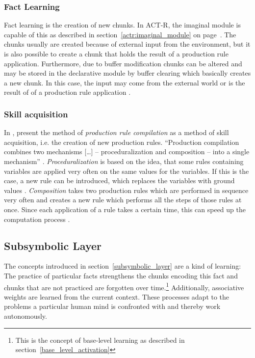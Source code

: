 \subsubsection{Fact Learning}

Fact learning is the creation of new chunks. In ACT-R, the imaginal module is capable of this as described in section~\ref{actr:imaginal_module} on page~\pageref{actr:imaginal_module}. The chunks usually are created because of external input from the environment, but it is also possible to create a chunk that holds the result of a production rule application. Furthermore, due to buffer modification chunks can be altered and may be stored in the declarative module by buffer clearing which basically creates a new chunk. In this case, the input may come from the external world or is the result of of a production rule application \cite[7]{whitehill_understanding}.

\subsubsection{Skill acquisition}

In \cite{taatgen_production_2003}, \citeauthor{taatgen_production_2003} present the method of \emph{production rule compilation} as a method of skill acquisition, i.e. the creation of new production rules. ``Production compilation combines two mechanisms [\dots] -- proceduralization and composition -- into a single mechanism'' \cite[62]{taatgen_production_2003}. \emph{Proceduralization} is based on the idea, that some rules containing variables are applied very often on the same values for the variables. If this is the case, a new rule can be introduced, which replaces the variables with ground values \cite[7]{whitehill_understanding}. \emph{Composition} takes two production rules which are performed in sequence very often and creates a new rule which performs all the steps of those rules at once. Since each application of a rule takes a certain time, this can speed up the computation process \cite[7]{whitehill_understanding}.

\subsection{Subsymbolic Layer}

The concepts introduced in section~\ref{subsymbolic_layer} are a kind of learning: The practice of particular facts strengthens the chunks encoding this fact and chunks that are not practiced are forgotten over time.\footnote{This is the concept of base-level learning as described in section~\ref{base_level_activation}} Additionally, associative weights are learned from the current context. These processes adapt to the problems a particular human mind is confronted with and thereby work autonomously.

